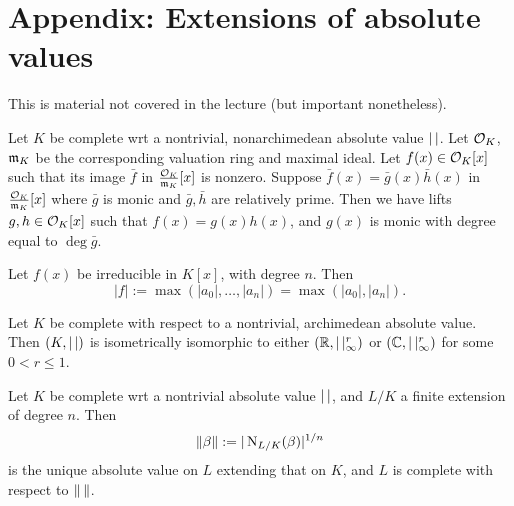 \documentclass[11pt]{amsart}
\begin{document}

\newpage


\section{Appendix: Extensions of absolute values}

This is material not covered in the lecture (but important nonetheless).

\begin{prop}

Let $K$ be complete wrt a nontrivial, nonarchimedean absolute value $|\thinspace|$. Let $\mathcal{O}_K$, $\mathfrak{m}_K$ be the corresponding valuation ring and maximal ideal. Let $f(x)\in \mathcal{O}_K[x]$ such that its image $\bar{f}$ in $\frac{\mathcal{O}_K}{\mathfrak{m}_K}[x]$ is nonzero. Suppose $\bar{f}(x) = \bar{g}(x)\bar{h}(x)$ in $\frac{\mathcal{O}_K}{\mathfrak{m}_K}[x]$ where $\bar{g}$ is monic and $\bar{g},\bar{h}$ are relatively prime. Then we have lifts $g,h\in \mathcal{O}_K[x]$ such that $f(x) = g(x)h(x)$, and $g(x)$ is monic with degree equal to $\deg \bar{g}$.
\end{prop}

\begin{cor}
\label{max_coeff}
Let $f(x)$ be irreducible in $K[x]$, with degree $n$. Then
\[|f| := \max(|a_0|,\dots,|a_n|) = \max(|a_0|, |a_n|).\]
\end{cor}

\begin{prop}
\label{complete_arch}
Let $K$ be complete with respect to a nontrivial, archimedean absolute value. Then $(K, |\thinspace|)$ is isometrically isomorphic to either $(\mathbb{R}, |\thinspace|_{\infty}^{r})$ or $(\mathbb{C}, |\thinspace|_{\infty}^{r})$ for some $0<r\le 1$.
\end{prop}

\begin{thm}
\label{extend_abs_val}
Let $K$ be complete wrt a nontrivial absolute value $|\thinspace|$, and $L/K$ a finite extension of degree $n$. Then
\[\left\| \beta \right\| := |\operatorname{N}_{L/K}(\beta)|^{1/n}\]
is the unique absolute value on $L$ extending that on $K$, and $L$ is complete with respect to $\left\| \thinspace \right\|$.
\end{thm}
\end{document}
